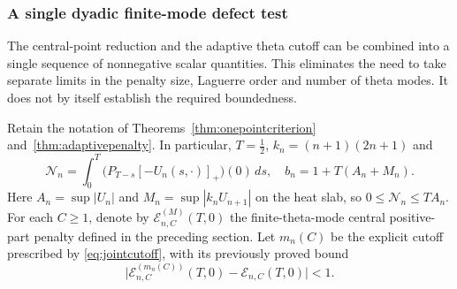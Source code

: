 \subsubsection{A single dyadic finite-mode defect test}
\label{subsec:dyadicdefect}
The central-point reduction and the adaptive theta cutoff
can be combined into a single sequence of nonnegative scalar
quantities. This eliminates the need to take separate limits
in the penalty size, Laguerre order and number of theta modes.
It does not by itself establish the required boundedness.

Retain the notation of Theorems~\ref{thm:onepointcriterion}
and~\ref{thm:adaptivepenalty}. In particular, $T=\tfrac12$,
$k_n=(n+1)(2n+1)$ and
\[
\mathcal N_n=
\int_0^T\bigl(P_{T-s}[-U_n(s,\cdot)]_+\bigr)(0)\,ds,
\quad
b_n=1+T(A_n+M_n).
\]
Here $A_n=\sup|U_n|$ and
$M_n=\sup|k_nU_{n+1}|$ on the heat slab,
so $0\le\mathcal N_n\le T A_n$.
For each $C\ge1$, denote by
$\mathcal E_{n,C}^{(M)}(T,0)$
the finite-theta-mode central positive-part penalty
defined in the preceding section.
Let $m_n(C)$ be the explicit cutoff prescribed by
\eqref{eq:jointcutoff}, with its previously proved bound
\[
\big|\mathcal E_{n,C}^{(m_n(C))}(T,0)
-\mathcal E_{n,C}(T,0)\big|<1.
\]


